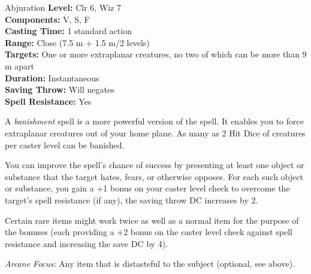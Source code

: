 {Abjuration}
{
	\textbf{Level:}
	Clr 6, Wiz 7\\
	\textbf{Components:}
	V, S, F\\
	\textbf{Casting Time:}
	1 standard action\\
	\textbf{Range:}
	Close (7.5 m + 1.5 m/2 levels)\\
	\textbf{Targets:}
	One or more extraplanar creatures, no two of which can be more than 9 m apart\\
	\textbf{Duration:}
	Instantaneous\\
	\textbf{Saving Throw:}
	Will negates\\
	\textbf{Spell Resistance:}
	Yes\\
}
{
	A \emph{banishment} spell is a more powerful version of the  spell. It enables you to force extraplanar creatures out of your home plane. As many as 2 Hit Dice of creatures per caster level can be banished.

	You can improve the spell's chance of success by presenting at least one object or substance that the target hates, fears, or otherwise opposes. For each such object or substance, you gain a +1 bonus on your caster level check to overcome the target's spell resistance (if any), the saving throw DC increases by 2.

	Certain rare items might work twice as well as a normal item for the purpose of the bonuses (each providing a +2 bonus on the caster level check against spell resistance and increasing the save DC by 4).

	\textit{Arcane Focus:}
	Any item that is distasteful to the subject (optional, see above).

}
